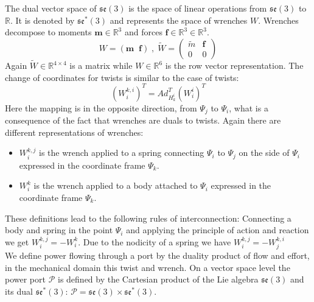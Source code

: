 \documentclass[a4paper,twoside, openright,12pt]{report}
\newcommand{\f}[1]{\boldsymbol{#1}}
\begin{document}
{The  dual vector space of $\mathfrak{se}(3)$ is the space of linear operations from $\mathfrak{se}(3)$ to $\mathbb{R} $. It is denoted by $\mathfrak{se}^*(3)$ and represents the space of wrenches $W$. Wrenches decompose to moments $ \f{m} \in \mathbb{R}^3 $ and forces $ \textbf{f} \in \mathbb{R}^3 \in \mathbb{R}^3$.
\begin{equation}
 W = ( \f{m} \;\; \textbf{f}) \; , \; \tilde{W} = \begin{pmatrix}
\tilde{m} & \textbf{f} \\ 0 & 0\end{pmatrix} \end{equation}
Again $\tilde{W} \in \mathbb{R}^{4\times 4}$ is a matrix while $W \in \mathbb{R}^6$ is the  row vector representation.
The change of coordinates for twists is similar to the case of twists:
\begin{equation}
(W_i^{k,i})^T = Ad_{H_k^i}^T (W_i^i)^T \end{equation} 
Here the mapping is in the opposite direction, from $\Psi_j$ to $\Psi_i$, what is a consequence of the fact that wrenches are duals to twists. Again there are different representations of wrenches: \begin{itemize}
\item $W_i^{k,j}$ is the wrench applied to a spring connecting $\Psi_i$ to $\Psi_j$ on the side of $\Psi_i$ expressed in the coordinate frame $\Psi_k$.
\item $W_i^k $ is the wrench applied to a body attached to $\Psi_i$ expressed in the coordinate frame $\Psi_k$.
\end{itemize}
These definitions lead to the following rules of interconnection:
Connecting a body and spring in the point $\Psi_i$ and applying the principle of action and reaction we get $W_i^{k,j} = -W_i^k$. Due to the nodicity of a spring we have $ W_i^{k,j} = -W_j^{k,i} $\\

We define power flowing through a port by the duality product of flow and effort, in the mechanical domain this twist and wrench. On a vector space level the power port $\mathcal{P}$ is defined by the Cartesian product of the Lie algebra $\mathfrak{se}(3)$ and its dual $\mathfrak{se}^*(3)$: $\mathcal{P} = \mathfrak{se}(3) \times \mathfrak{se}^*(3)$.

}
\end{document}
